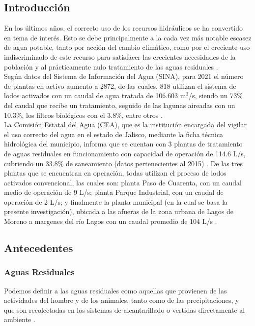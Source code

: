 \subsection*{Introducción}
En los últimos años, el correcto uso de los recursos hidráulicos se ha convertido en tema de interés. Esto se debe principalmente a la cada vez más notable escasez de agua potable, tanto por acción del cambio climático, como por el creciente uso indiscriminado de este recurso para satisfacer las crecientes necesidades de la población y al prácticamente nulo tratamiento de las aguas residuales \emph{\citep{informeods2021, aa2030}}.\\
Según datos del Sistema de Información del Agua (SINA), para 2021 el número de plantas en activo aumento a 2872, de las cuales, 818 utilizan el sistema de lodos activados con un caudal de agua tratada de 106.603 m$^{3}$/s, siendo un 73\% del caudal que recibe un tratamiento, seguido de las lagunas aireadas con un 10.3\%, los filtros biológicos con el 3.8\%, entre otros \emph{\citep{SINA}}.\\
La Comisión Estatal del Agua (CEA), que es la institución encargada del vigilar el uso correcto del agua en el estado de Jalisco, mediante la ficha técnica hidrológica del municipio, informa que se cuentan con 3 plantas de tratamiento de aguas residuales  en funcionamiento con capacidad de operación de 114.6 L/s, cubriendo un 33.8\% de saneamiento (datos pertenecientes al 2015) \emph{\citep{fichalagos}}. De las tres plantas que se encuentran en operación, todas utilizan el proceso de lodos activados convencional, las cuales son: planta Paso de Cuarenta, con un caudal medio de operación de 9 L/s; planta Parque Industrial, con un caudal de operación de 2 L/s; y finalmente la planta municipal (en la cual se basa la presente investigación), ubicada a las afueras de la zona urbana de Lagos de Moreno a margenes del río Lagos con un caudal promedio de 104 L/s \emph{\citep{fichalagos}}.
\subsection*{Antecedentes}
\subsubsection*{Aguas Residuales}
Podemos definir a las aguas residuales como aquellas que provienen de las actividades del hombre y de los animales, tanto como de las precipitaciones, y que son recolectadas en los sistemas de alcantarillado o vertidas directamente al ambiente \emph{\citep{carreno17}}.
